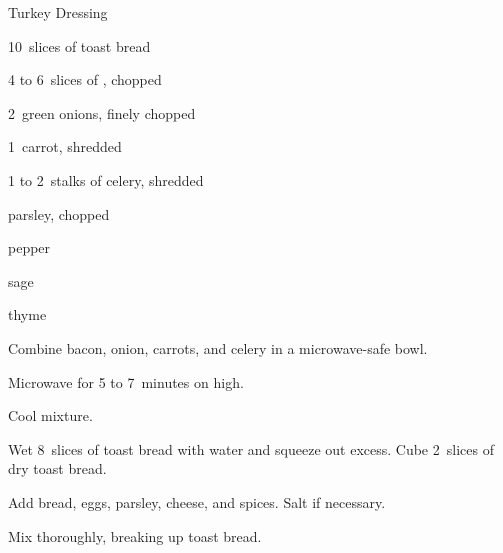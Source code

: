 \begin{recipe}{Turkey Dressing}{}{}

\begin{ingredients}
\item 10~slices of toast bread
\item 4 to 6~slices of , chopped
\item 2~green onions, finely chopped
\item 1~carrot, shredded
\item 1 to 2~stalks of celery, shredded
\item \C{\quarter} parsley, chopped
\item \C{\quarter} 
\item pepper
\item sage
\item thyme
\end{ingredients}

\begin{directions}
\item Combine bacon, onion, carrots, and celery in a microwave-safe bowl.
\item Microwave for 5 to 7~minutes on high.
\item Cool mixture.
\item Wet 8~slices of toast bread with water and squeeze out excess. Cube 2~slices of dry toast bread.
\item Add bread, eggs, parsley, cheese, and spices. Salt if necessary.
\item Mix thoroughly, breaking up toast bread.
\end{directions}

\end{recipe}
